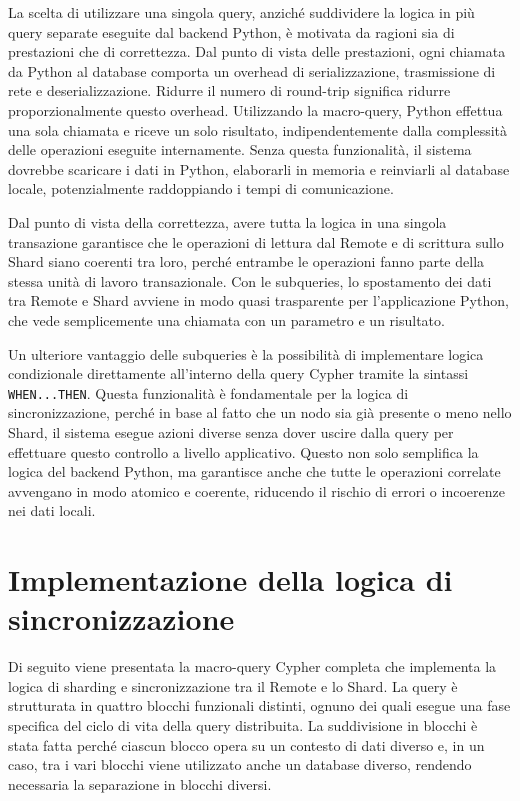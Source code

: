 La scelta di utilizzare una singola query, anziché suddividere la logica in più query separate eseguite dal backend Python, è motivata da ragioni sia di prestazioni che di correttezza. Dal punto di vista delle prestazioni, ogni chiamata da Python al database comporta un overhead di serializzazione, trasmissione di rete e deserializzazione. Ridurre il numero di round-trip significa ridurre proporzionalmente questo overhead. Utilizzando la macro-query, Python effettua una sola chiamata e riceve un solo risultato, indipendentemente dalla complessità delle operazioni eseguite internamente. Senza questa funzionalità, il sistema dovrebbe scaricare i dati in Python, elaborarli in memoria e reinviarli al database locale, potenzialmente raddoppiando i tempi di comunicazione.

Dal punto di vista della correttezza, avere tutta la logica in una singola transazione garantisce che le operazioni di lettura dal Remote e di scrittura sullo Shard siano coerenti tra loro, perché entrambe le operazioni fanno parte della stessa unità di lavoro transazionale. Con le subqueries, lo spostamento dei dati tra Remote e Shard avviene in modo quasi trasparente per l'applicazione Python, che vede semplicemente una chiamata con un parametro e un risultato.

Un ulteriore vantaggio delle subqueries è la possibilità di implementare logica condizionale direttamente all'interno della query Cypher tramite la sintassi \texttt{WHEN...THEN}. Questa funzionalità è fondamentale per la logica di sincronizzazione, perché in base al fatto che un nodo sia già presente o meno nello Shard, il sistema esegue azioni diverse senza dover uscire dalla query per effettuare questo controllo a livello applicativo. Questo non solo semplifica la logica del backend Python, ma garantisce anche che tutte le operazioni correlate avvengano in modo atomico e coerente, riducendo il rischio di errori o incoerenze nei dati locali.

\newpage

\section{Implementazione della logica di sincronizzazione}

Di seguito viene presentata la macro-query Cypher completa che implementa la logica di sharding e sincronizzazione tra il Remote e lo Shard. La query è strutturata in quattro blocchi funzionali distinti, ognuno dei quali esegue una fase specifica del ciclo di vita della query distribuita. La suddivisione in blocchi è stata fatta perché ciascun blocco opera su un contesto di dati diverso e, in un caso, tra i vari blocchi viene utilizzato anche un database diverso, rendendo necessaria la separazione in blocchi diversi.

